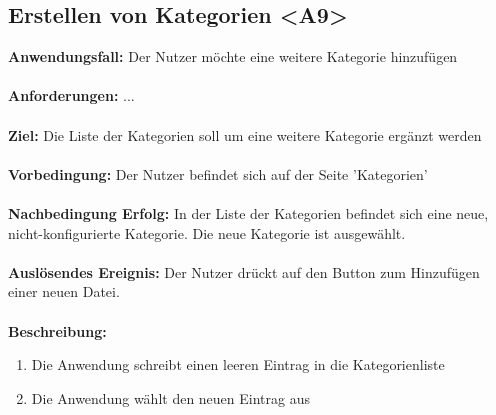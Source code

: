 \documentclass[parskip=full]{scrartcl} %
\begin{document}
\subsection*{Erstellen von Kategorien <A9>}
\textbf{Anwendungsfall:} Der Nutzer möchte eine weitere Kategorie hinzufügen\\\\
\textbf{Anforderungen:} ...\\\\
\textbf{Ziel:} Die Liste der Kategorien soll um eine weitere Kategorie ergänzt werden \\\\
\textbf{Vorbedingung:} Der Nutzer befindet sich auf der Seite 'Kategorien' \\\\
\textbf{Nachbedingung Erfolg:} In der Liste der Kategorien befindet sich eine neue, nicht-konfigurierte Kategorie. Die neue Kategorie ist ausgewählt.\\\\
\textbf{Auslösendes Ereignis:} Der Nutzer drückt auf den Button zum Hinzufügen einer neuen Datei. \\\\
\textbf{Beschreibung:}
\begin{enumerate}
    \item Die Anwendung schreibt einen leeren Eintrag in die Kategorienliste
    \item Die Anwendung wählt den neuen Eintrag aus
\end{enumerate}
\newpage
\end{document}
